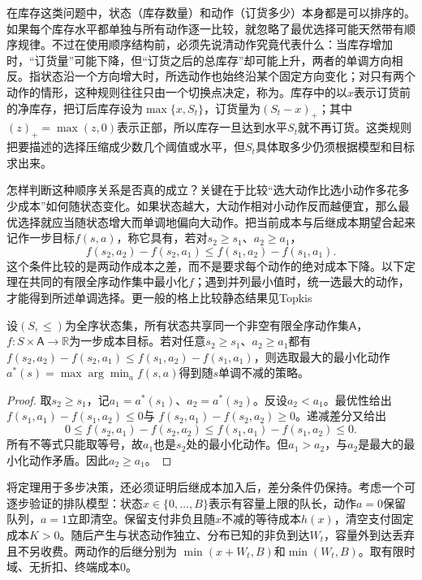 在库存这类问题中，状态（库存数量）和动作（订货多少）本身都是可以排序的。如果每个库存水平都单独与所有动作逐一比较，就忽略了最优选择可能天然带有顺序规律。不过在使用顺序结构前，必须先说清动作究竟代表什么：当库存增加时，“订货量”可能下降，但“订货之后的总库存”却可能上升，两者的单调方向相反。指状态沿一个方向增大时，所选动作也始终沿某个固定方向变化；对只有两个动作的情形，这种规则往往只由一个切换点决定，称为。库存中的以$x$表示订货前的净库存，把订后库存设为$\max\{x,S_t\}$，订货量为$(S_t-x)_+$；其中$(z)_+=\max(z,0)$表示正部，所以库存一旦达到水平$S_t$就不再订货。这类规则把要描述的选择压缩成少数几个阈值或水平，但$S_t$具体取多少仍须根据模型和目标求出来。

怎样判断这种顺序关系是否真的成立？关键在于比较“选大动作比选小动作多花多少成本”如何随状态变化。如果状态越大，大动作相对小动作反而越便宜，那么最优选择就应当随状态增大而单调地偏向大动作。把当前成本与后继成本期望合起来记作一步目标$f(s,a)$，称它具有，若对$s_2\geq s_1$、$a_2\geq a_1$，
\begin{equation}
 f(s_2,a_2)-f(s_2,a_1)
 \leq f(s_1,a_2)-f(s_1,a_1).
 \label{eq:rl-planning-decreasing-differences}
\end{equation}
这个条件比较的是两动作成本之差，而不是要求每个动作的绝对成本下降。以下定理在共同的有限全序动作集中最小化$f$；遇到并列最小值时，统一选最大的动作，才能得到所述单调选择。更一般的格上比较静态结果见Topkis

\begin{theorem}[递减差分给出单调最优动作]
 \label{thm:rl-planning-monotone}
 设$(S,\leq)$为全序状态集，所有状态共享同一个非空有限全序动作集$\mathsf A$，$f:S\times\mathsf A\to\mathbb R$为一步成本目标。若对任意$s_2\geq s_1$、$a_2\geq a_1$都有$f(s_2,a_2)-f(s_2,a_1)\leq f(s_1,a_2)-f(s_1,a_1)$，则选取最大的最小化动作
 $a^*(s)=\max\arg\min_a f(s,a)$得到随$s$单调不减的策略。
\end{theorem}
\begin{proof}
 取$s_2\geq s_1$，记$a_1=a^*(s_1)$、$a_2=a^*(s_2)$。反设$a_2<a_1$。最优性给出
 $f(s_1,a_1)-f(s_1,a_2)\leq0$与
 $f(s_2,a_1)-f(s_2,a_2)\geq0$。递减差分又给出
 \[
 0\leq f(s_2,a_1)-f(s_2,a_2)
 \leq f(s_1,a_1)-f(s_1,a_2)\leq0.
 \]
 所有不等式只能取等号，故$a_1$也是$s_2$处的最小化动作。但$a_1>a_2$，与$a_2$是最大的最小化动作矛盾。因此$a_2\geq a_1$。
\end{proof}

将定理用于多步决策，还必须证明后继成本加入后，差分条件仍保持。考虑一个可逐步验证的排队模型：状态$x\in\{0,\ldots,B\}$表示有容量上限的队长，动作$a=0$保留队列，$a=1$立即清空。保留支付非负且随$x$不减的等待成本$h(x)$，清空支付固定成本$K>0$。随后产生与状态动作独立、分布已知的非负到达$W_t$，容量外到达丢弃且不另收费。两动作的后继分别为
$\min(x+W_t,B)$和$\min(W_t,B)$。取有限时域、无折扣、终端成本0。

